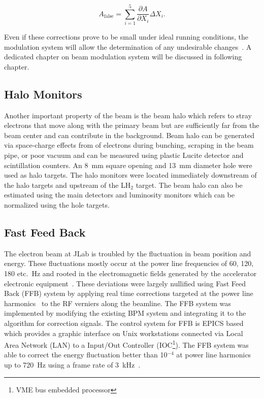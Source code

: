 \begin{equation} \label{equ:bm1}
A_{\textrm{false}} = \sum^{5}_{i=1}\frac{ \partial A }{ \partial X_{i} } \Delta X_{i}.
\end{equation}

Even if these corrections prove to be small under ideal running conditions, the modulation system will allow the determination of any undesirable changes~\cite{nur_bm_final}. 
A dedicated chapter on beam modulation system will be discussed in following chapter.



\subsection{Halo Monitors}%
\label{Halo Monitors}

Another important property of the beam is the beam halo which refers to stray electrons that move along with the primary beam but are sufficiently far from the beam center and can contribute in the background. Beam halo can be generated via space-charge effects from of electrons during bunching, scraping in the beam pipe, or poor vacuum and can be measured using plastic Lucite detector and scintillation counters. 
An 8~mm square opening and 13~mm diameter hole were used as halo targets. The halo monitors were located immediately downstream of the halo targets and upstream of the LH$_{2}$ target. The beam halo can also be estimated using the main detectors and luminosity monitors which can be normalized using the hole targets.


\subsection{Fast Feed Back}%
\label{Fast Feed Back}

The electron beam at JLab is troubled by the fluctuation in beam position and energy. These fluctuations mostly occur at the power line frequencies of 60, 120, 180 etc.~Hz and rooted in the electromagnetic fields generated by the accelerator electronic equipment~\cite{jlab_ffb1}. These deviations were largely nullified using Fast Feed Back (FFB) system by applying real time corrections targeted at the power line harmonics~\cite{jlab_ffb2} to the RF verniers along the beamline. The FFB system was implemented by modifying the existing BPM system and integrating it to the algorithm for correction signals. The control system for FFB is EPICS based which provides a graphic interface on Unix workstations connected via Local Area Network (LAN) to a Input/Out Controller (IOC\footnote{VME bus embedded processor}). The FFB system was able to correct the energy fluctuation better than 10$^{-4}$ at power line harmonics up to 720~Hz using a frame rate of 3~kHz~\cite{jlab_ffb1}.

